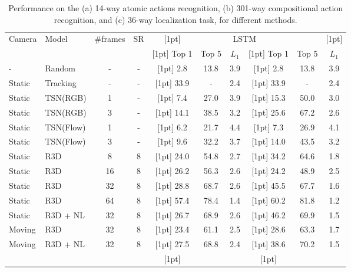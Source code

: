 \documentclass{article} %
\begin{document}
\begin{table}[h]
    \caption{Performance on the (a) 14-way atomic actions recognition, (b) 301-way compositional action recognition, and (c) 36-way localization task, for different methods.}
    \label{tab:girdhar2019cater}
    \begin{center}
    \begin{tabular}{llcc>{\columncolor[gray]{.85}[1pt]}ccc>{\columncolor[gray]{.85}[1pt]}ccc}
    \toprule
        Camera  & Model     & \#frames  & SR    & \multicolumn{3}{c}{Avg}   & \multicolumn{3}{c}{LSTM}  \\ 
                &           &           &       & Top 1 & Top 5 & $L_1$     & Top 1 & Top 5 & $L_1$     \\ \midrule
        -       & Random    & -         & -     & 2.8   & 13.8  & 3.9       & 2.8   & 13.8  & 3.9       \\ \arrayrulecolor[gray]{.85}\midrule
        Static  & Tracking  & -         & -     & 33.9  & -     & 2.4       & 33.9  & -     & 2.4       \\ \midrule
        Static  & TSN(RGB)  & 1         & -     & 7.4   & 27.0  & 3.9       & 15.3  & 50.0  & 3.0       \\ 
        Static  & TSN(RGB)  & 3         & -     & 14.1  & 38.5  & 3.2       & 25.6  & 67.2  & 2.6       \\ 
        Static  & TSN(Flow) & 1         & -     & 6.2   & 21.7  & 4.4       & 7.3   & 26.9  & 4.1       \\ 
        Static  & TSN(Flow) & 3         & -     & 9.6   & 32.2  & 3.7       & 14.0  & 43.5  & 3.2       \\ \midrule
        Static  & R3D       & 8         & 8     & 24.0  & 54.8  & 2.7       & 34.2  & 64.6  & 1.8       \\
        Static  & R3D       & 16        & 8     & 26.2  & 56.3  & 2.6       & 24.2  & 48.9  & 2.5       \\
        Static  & R3D       & 32        & 8     & 28.8  & 68.7  & 2.6       & 45.5  & 67.7  & 1.6       \\
        Static  & R3D       & 64        & 8     & 57.4  & 78.4  & 1.4       & 60.2  & 81.8  & 1.2       \\ \midrule
        Static  & R3D + NL  & 32        & 8     & 26.7  & 68.9  & 2.6       & 46.2  & 69.9  & 1.5       \\ \midrule
        Moving  & R3D       & 32        & 8     & 23.4  & 61.1  & 2.5       & 28.6  & 63.3  & 1.7       \\
        Moving  & R3D + NL  & 32        & 8     & 27.5  & 68.8  & 2.4       & 38.6  & 70.2  & 1.5       \\ \arrayrulecolor[gray]{0}
    \bottomrule
    \end{tabular}
    \end{center}
\end{table}
\end{document}

